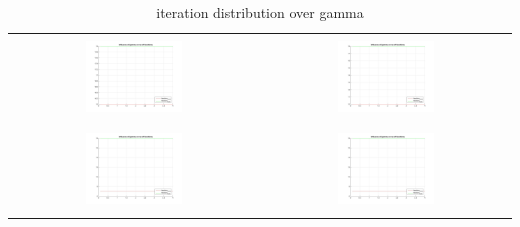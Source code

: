 \documentclass[]{report}
\begin{document}
\begin{table}[h]
\begin{tabular}{| c | c |}
\hline
 & \\
\includegraphics[width=0.4\textwidth]{./images/GammaToIterations_0150.jpg} & \includegraphics[width=0.4\textwidth]{./images/GammaToIterations_0250.jpg} \\
 & \\
\hline
 & \\
\includegraphics[width=0.4\textwidth]{./images/GammaToIterations_0350.jpg} & \includegraphics[width=0.4\textwidth]{./images/GammaToIterations_0450.jpg} \\
 & \\
\hline
\end{tabular}
\caption{iteration distribution over gamma}
\label{tab:GammaToIterations}
\end{table}
\end{document}
